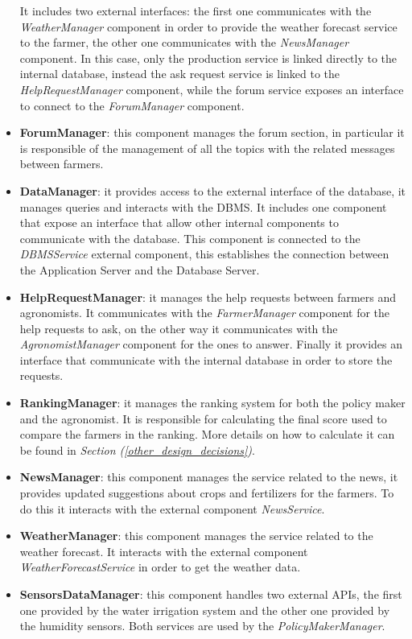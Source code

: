 \documentclass[table, 12pt]{article}
\begin{document}
\begin{itemize}
    It includes two external interfaces: the first one communicates with the \textit{WeatherManager} component in order to provide the weather forecast service to the farmer, the other one communicates with the \textit{NewsManager} component.
    In this case, only the production service is linked directly to the internal database, instead the ask request service is linked to the \textit{HelpRequestManager} component, while the forum service exposes an interface to connect to the \textit{ForumManager} component.
    \item \textbf{ForumManager}: this component manages the forum section, in particular it is responsible of the management of all the topics with the related messages between farmers.
    \item \textbf{DataManager}: it provides access to the external interface of the database, it manages queries and interacts with the DBMS.
    It includes one component that expose an interface that allow other internal components to communicate with the database.
    This component is connected to the \textit{DBMSService} external component, this establishes the connection between the Application Server and the Database Server.
    \item \textbf{HelpRequestManager}: it manages the help requests between farmers and agronomists.
    It communicates with the \textit{FarmerManager} component for the help requests to ask, on the other way it communicates with the \textit{AgronomistManager} component for the ones to answer.
    Finally it provides an interface that communicate with the internal database in order to store the requests.
    \item \textbf{RankingManager}: it manages the ranking system for both the policy maker and the agronomist.
    It is responsible for calculating the final score used to compare the farmers in the ranking.
    More details on how to calculate it can be found in \textit{Section (\ref{other_design_decisions})}.
    \item \textbf{NewsManager}: this component manages the service related to the news, it provides updated suggestions about crops and fertilizers for the farmers.
    To do this it interacts with the external component \textit{NewsService}.
    \item \textbf{WeatherManager}: this component manages the service related to the weather forecast.
    It interacts with the external component \textit{WeatherForecastService} in order to get the weather data.
    \item \textbf{SensorsDataManager}: this component handles two external APIs, the first one provided by the water irrigation system and the other one provided by the humidity sensors.
    Both services are used by the \textit{PolicyMakerManager}.
\end{itemize}
\end{document}
